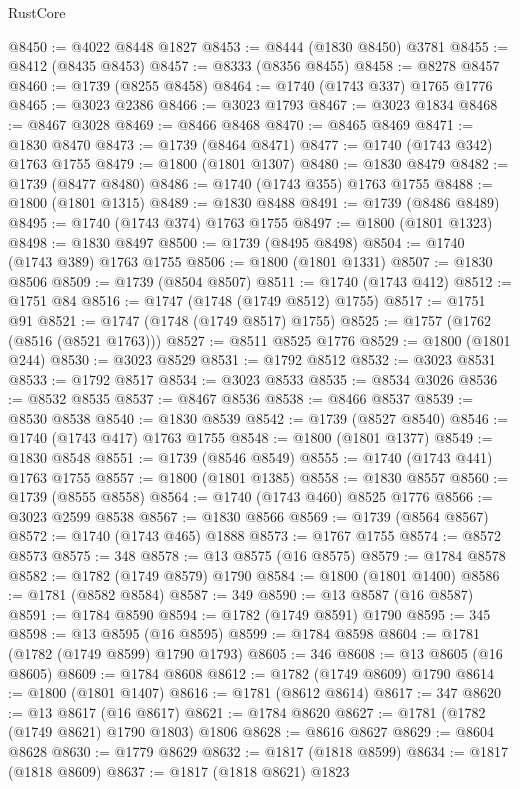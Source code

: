 \begin{lexlean}{RustCore}
\begin{coremodule}
@8450 := @4022 @8448 @1827
@8453 := @8444 (@1830 @8450) @3781
@8455 := @8412 (@8435 @8453)
@8457 := @8333 (@8356 @8455)
@8458 := @8278 @8457
@8460 := @1739 (@8255 @8458)
@8464 := @1740 (@1743 @337) @1765 @1776
@8465 := @3023 @2386
@8466 := @3023 @1793
@8467 := @3023 @1834
@8468 := @8467 @3028
@8469 := @8466 @8468
@8470 := @8465 @8469
@8471 := @1830 @8470
@8473 := @1739 (@8464 @8471)
@8477 := @1740 (@1743 @342) @1763 @1755
@8479 := @1800 (@1801 @1307)
@8480 := @1830 @8479
@8482 := @1739 (@8477 @8480)
@8486 := @1740 (@1743 @355) @1763 @1755
@8488 := @1800 (@1801 @1315)
@8489 := @1830 @8488
@8491 := @1739 (@8486 @8489)
@8495 := @1740 (@1743 @374) @1763 @1755
@8497 := @1800 (@1801 @1323)
@8498 := @1830 @8497
@8500 := @1739 (@8495 @8498)
@8504 := @1740 (@1743 @389) @1763 @1755
@8506 := @1800 (@1801 @1331)
@8507 := @1830 @8506
@8509 := @1739 (@8504 @8507)
@8511 := @1740 (@1743 @412)
@8512 := @1751 @84
@8516 := @1747 (@1748 (@1749 @8512) @1755)
@8517 := @1751 @91
@8521 := @1747 (@1748 (@1749 @8517) @1755)
@8525 := @1757 (@1762 (@8516 (@8521 @1763)))
@8527 := @8511 @8525 @1776
@8529 := @1800 (@1801 @244)
@8530 := @3023 @8529
@8531 := @1792 @8512
@8532 := @3023 @8531
@8533 := @1792 @8517
@8534 := @3023 @8533
@8535 := @8534 @3026
@8536 := @8532 @8535
@8537 := @8467 @8536
@8538 := @8466 @8537
@8539 := @8530 @8538
@8540 := @1830 @8539
@8542 := @1739 (@8527 @8540)
@8546 := @1740 (@1743 @417) @1763 @1755
@8548 := @1800 (@1801 @1377)
@8549 := @1830 @8548
@8551 := @1739 (@8546 @8549)
@8555 := @1740 (@1743 @441) @1763 @1755
@8557 := @1800 (@1801 @1385)
@8558 := @1830 @8557
@8560 := @1739 (@8555 @8558)
@8564 := @1740 (@1743 @460) @8525 @1776
@8566 := @3023 @2599 @8538
@8567 := @1830 @8566
@8569 := @1739 (@8564 @8567)
@8572 := @1740 (@1743 @465) @1888
@8573 := @1767 @1755
@8574 := @8572 @8573
@8575 := 348
@8578 := @13 @8575 (@16 @8575)
@8579 := @1784 @8578
@8582 := @1782 (@1749 @8579) @1790
@8584 := @1800 (@1801 @1400)
@8586 := @1781 (@8582 @8584)
@8587 := 349
@8590 := @13 @8587 (@16 @8587)
@8591 := @1784 @8590
@8594 := @1782 (@1749 @8591) @1790
@8595 := 345
@8598 := @13 @8595 (@16 @8595)
@8599 := @1784 @8598
@8604 := @1781 (@1782 (@1749 @8599) @1790 @1793)
@8605 := 346
@8608 := @13 @8605 (@16 @8605)
@8609 := @1784 @8608
@8612 := @1782 (@1749 @8609) @1790
@8614 := @1800 (@1801 @1407)
@8616 := @1781 (@8612 @8614)
@8617 := 347
@8620 := @13 @8617 (@16 @8617)
@8621 := @1784 @8620
@8627 := @1781 (@1782 (@1749 @8621) @1790 @1803) @1806
@8628 := @8616 @8627
@8629 := @8604 @8628
@8630 := @1779 @8629
@8632 := @1817 (@1818 @8599)
@8634 := @1817 (@1818 @8609)
@8637 := @1817 (@1818 @8621) @1823

\end{coremodule}
\end{lexlean}
